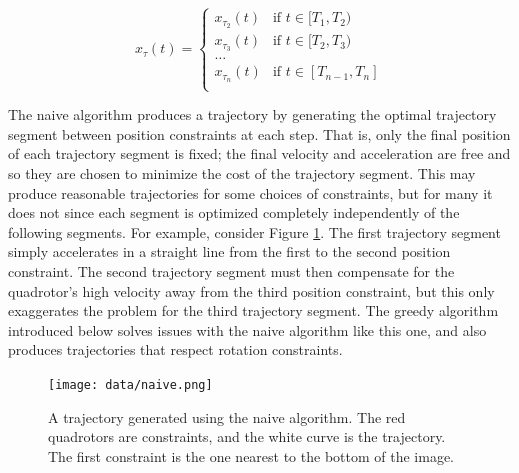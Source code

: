 \documentclass[pageno]{jpaper}
\begin{document}
\begin{equation*}
  x_{\tau}(t) = \begin{cases}
    x_{\tau_2}(t) & \text{if } t \in [T_1, T_2) \\
    x_{\tau_3}(t) & \text{if } t \in [T_2, T_3) \\
    \dots \\
    x_{\tau_n}(t) & \text{if } t \in [T_{n-1}, T_n] \\
  \end{cases}
\end{equation*}

The naive algorithm produces a trajectory by generating the optimal trajectory segment between position constraints at each step. That is, only the final position of each trajectory segment is fixed; the final velocity and acceleration are free and so they are chosen to minimize the cost of the trajectory segment. This may produce reasonable trajectories for some choices of constraints, but for many it does not since each segment is optimized completely independently of the following segments. For example, consider Figure \ref{fig:naive}. The first trajectory segment simply accelerates in a straight line from the first to the second position constraint. The second trajectory segment must then compensate for the quadrotor's high velocity away from the third position constraint, but this only exaggerates the problem for the third trajectory segment. The greedy algorithm introduced below solves issues with the naive algorithm like this one, and also produces trajectories that respect rotation constraints.

\begin{figure}[hbt]
  \texttt{[image: data/naive.png]}
  \caption{A trajectory generated using the naive algorithm. The red quadrotors are constraints, and the white curve is the trajectory. The first constraint is the one nearest to the bottom of the image.}
  \label{fig:naive}
\end{figure}
\end{document}
